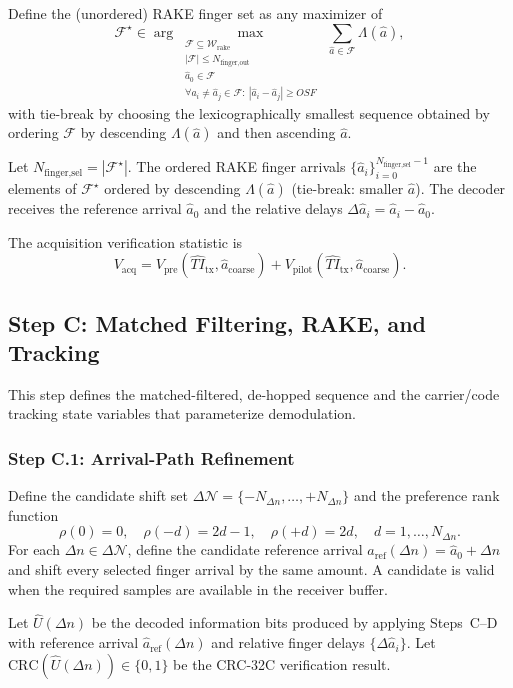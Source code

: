 \documentclass[11pt]{article}
\begin{document}
Define the (unordered) RAKE finger set as any maximizer of
\[
  \mathcal{F}^\star\in\arg\max_{\substack{\mathcal{F}\subseteq\mathcal{W}_{\text{rake}}\\ |\mathcal{F}|\le N_{\text{finger,out}}\\ \hat a_0\in\mathcal{F}\\ \forall \hat a_i\neq \hat a_j\in\mathcal{F}:\ |\hat a_i-\hat a_j|\ge \mathit{OSF}}}\ \sum_{\hat a\in\mathcal{F}}\Lambda(\hat a),
\]
with tie-break by choosing the lexicographically smallest sequence obtained by ordering $\mathcal{F}$ by descending $\Lambda(\hat a)$ and then ascending $\hat a$.

Let $N_{\text{finger,sel}}=|\mathcal{F}^\star|$. The ordered RAKE finger arrivals
$\{\hat a_i\}_{i=0}^{N_{\text{finger,sel}}-1}$ are the elements of $\mathcal{F}^\star$ ordered by
descending $\Lambda(\hat a)$ (tie-break: smaller $\hat a$). The decoder receives the reference
arrival $\hat a_0$ and the relative delays $\Delta\hat a_i=\hat a_i-\hat a_0$.

The acquisition verification statistic is
\[
  V_{\text{acq}}=V_{\text{pre}}(\widehat{\mathit{TI}}_{\text{tx}},\hat a_{\text{coarse}})+V_{\text{pilot}}(\widehat{\mathit{TI}}_{\text{tx}},\hat a_{\text{coarse}}).
\]

\subsection{Step C: Matched Filtering, RAKE, and Tracking}

This step defines the matched-filtered, de-hopped sequence and the carrier/code tracking state variables that parameterize demodulation.

\subsubsection{Step C.1: Arrival-Path Refinement}

Define the candidate shift set $\Delta\mathcal{N}=\{-N_{\Delta n},\dots,+N_{\Delta n}\}$ and the preference rank function
\[
  \rho(0)=0,\quad \rho(-d)=2d-1,\quad \rho(+d)=2d,\quad d=1,\dots,N_{\Delta n}.
\]
For each $\Delta n\in\Delta\mathcal{N}$, define the candidate reference arrival
$\hat a_{\text{ref}}(\Delta n)=\hat a_0+\Delta n$ and shift every selected finger arrival by
the same amount. A candidate is valid when the required samples are available in the receiver
buffer.

Let $\hat U(\Delta n)$ be the decoded information bits produced by applying Steps~C--D with
reference arrival $\hat a_{\text{ref}}(\Delta n)$ and relative finger delays
$\{\Delta\hat a_i\}$. Let $\mathrm{CRC}(\hat U(\Delta n))\in\{0,1\}$ be the CRC-32C verification result.
\end{document}
